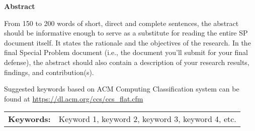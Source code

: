 \begin{center}
\textbf{Abstract}
\end{center}
\setlength{\parindent}{0pt}
From 150 to 200 words of short, direct and complete sentences, the abstract 
should be informative enough to serve as a substitute for reading the entire SP document 
itself.  It states the rationale and the objectives of the research.  
In the final Special Problem  document (i.e., the document you'll submit for your final defense), the  abstract should also contain a description of your research results, findings,  and contribution(s).


Suggested keywords based on ACM Computing Classification system can be found at \url{https://dl.acm.org/ccs/ccs_flat.cfm}

\begin{tabular}{lp{4.25in}}
\hspace{-0.5em}\textbf{Keywords:}\hspace{0.25em} & Keyword 1, keyword 2, keyword 3, keyword 4, etc.\\
\end{tabular}
